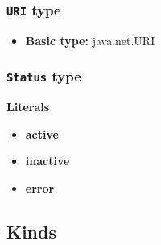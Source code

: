 \subsubsection{\texttt{URI} type}

\begin{itemize}
\item \textbf{Basic type:} java.net.URI
\end{itemize}
\subsubsection{\texttt{Status} type}

\textbf{Literals}
\begin{itemize}
\item \textbf{active} 
\end{itemize}
\begin{itemize}
\item \textbf{inactive} 
\end{itemize}
\begin{itemize}
\item \textbf{error} 
\end{itemize}

\subsection{Kinds}
